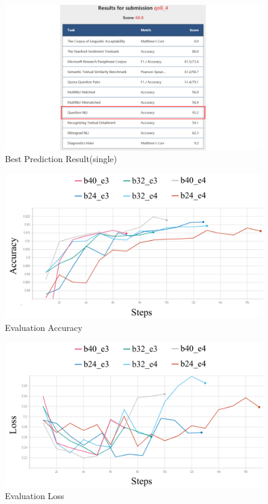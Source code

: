 \documentclass[10pt,journal,compsoc]{IEEEtran}
\begin{document}
\begin{figure}[!t]
  \centering
  \includegraphics[width=1\linewidth]{images/best_single}
  \caption{Best Prediction Result(single)}
  \label{fig:best_single}
\end{figure}

\begin{figure}[!t]
  \centering
  \includegraphics[width=1\linewidth]{images/eval_acc}
  \caption{Evaluation Accuracy}
  \label{fig:eval_acc}
\end{figure}

\begin{figure}[!t]
  \centering
  \includegraphics[width=1\linewidth]{images/eval_loss}
  \caption{Evaluation Loss}
  \label{fig:eval_loss}
\end{figure}
\end{document}
